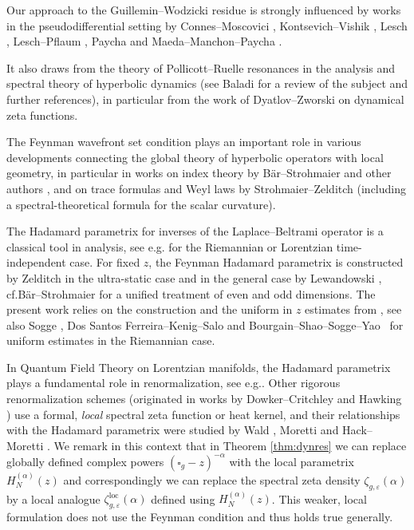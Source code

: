 \documentclass[10pt]{amsart}
\theoremstyle{definition}
\newcommand\loc{\mathrm{loc}}
\let\cv\alpha
\providecommand{\eg}{e.g.}\providecommand{\ie}{i.e.}\providecommand{\etc}{etc.}\providecommand{\resp}{resp.}\providecommand{\cf}{cf.}
\begin{document}
Our approach to the Guillemin--Wodzicki residue \cite{wodzicki,Guillemin1985} is strongly influenced by works in the pseudodifferential setting by Connes--Moscovici \cite{Connes1995}, Kontsevich--Vishik \cite{Kontsevich1995}, Lesch \cite{Lesch}, Lesch--Pflaum \cite{Lesch2000}, Paycha \cite{paycha2,paycha} and Maeda--Manchon--Paycha \cite{Maeda2005}.

It also draws from the theory of Pollicott--Ruelle resonances \cite{Pollicott1986,Ruelle1986} in the analysis and spectral theory
of hyperbolic dynamics (see Baladi \cite{Baladi2018} for a review of the subject and further references), in particular from the work of Dyatlov--Zworski \cite{Dyatlov2016} on dynamical zeta functions.

The Feynman wavefront set condition plays an important role in various
developments connecting the global theory of hyperbolic operators with
local geometry, in particular in works on index theory by Bär--Strohmaier and other authors \cite{Bar2019,Baer2020,Shen2021}, and on trace formulas and Weyl laws by Strohmaier--Zelditch \cite{Strohmaier2020b,Strohmaier2020,Strohmaier2020a} (including a spectral-theoretical formula for the scalar curvature).

The Hadamard parametrix for inverses of the Laplace--Beltrami operator is a classical tool in analysis, see \eg \cite{HormanderIII,soggeHangzhou,StevenZelditch2012,Zelditch2017} for the Riemannian or Lorentzian time-independent case. For fixed $z$, the Feynman Hadamard parametrix is constructed by Zelditch \cite{StevenZelditch2012} in the ultra-static case and in the general case by Lewandowski \cite{Lewandowski2020}, \cf Bär--Strohmaier \cite{Baer2020} for a unified treatment of even and odd dimensions. The present work relies on the construction and the uniform in $z$ estimates from \cite{Dang2020}, see also Sogge \cite{Sogge1988}, Dos Santos Ferreira--Kenig--Salo \cite{Ferreira2014} and Bourgain--Shao--Sogge--Yao~\cite{Bourgain2015} for uniform estimates in the Riemannian case.

In Quantum Field Theory on Lorentzian manifolds, the Hadamard parametrix plays a fundamental role in renormalization, see \eg \cite{DeWitt1975,Fulling1989,Kay1991,Radzikowski1996,Moretti1999,Brunetti2000,Hollands2001}. Other rigorous renormalization schemes (originated in works by Dowker--Critchley \cite{Dowker1976} and Hawking \cite{Hawking1977}) use a formal, \emph{local} spectral zeta function or heat kernel, and their relationships with the Hadamard parametrix were studied by Wald \cite{Wald1979}, Moretti \cite{Moretti1999,morettilong} and Hack--Moretti \cite{Hack2012a}. We remark in this context that in Theorem \ref{thm:dynres} we can replace globally defined complex powers $(\square_g-z)^{-\cv}$ with the local parametrix $H_N^{(\cv)}(z)$ and correspondingly we can replace the spectral zeta density $\zeta_{g,\varepsilon}(\cv)$ by a local analogue $\zeta_{g,\varepsilon}^{\loc}(\cv)$ defined using $H_N^{(\cv)}(z)$. This weaker, local formulation does not use the Feynman condition and thus holds true generally.
\end{document}
